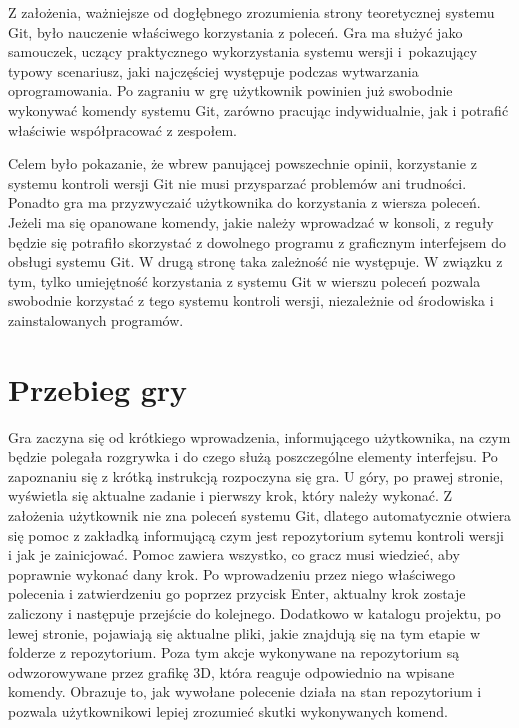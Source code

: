 \documentclass[11pt,a4paper,polish,thesis]{dcsbook}
\begin{document}
	Z założenia, ważniejsze od dogłębnego zrozumienia strony teoretycznej systemu Git, było nauczenie właściwego korzystania z poleceń. Gra ma służyć jako samouczek, uczący praktycznego wykorzystania systemu wersji i~pokazujący typowy scenariusz, jaki najczęściej występuje podczas wytwarzania oprogramowania. Po zagraniu w grę użytkownik powinien już swobodnie wykonywać komendy systemu Git, zarówno pracując indywidualnie, jak i potrafić właściwie współpracować z zespołem. 
	
	Celem było pokazanie, że wbrew panującej powszechnie opinii, korzystanie z systemu kontroli wersji Git nie musi przysparzać problemów ani trudności. Ponadto gra ma przyzwyczaić użytkownika do korzystania z wiersza poleceń. Jeżeli ma się opanowane komendy, jakie należy wprowadzać w konsoli, z reguły będzie się potrafiło skorzystać z dowolnego programu z graficznym interfejsem do obsługi systemu Git. W drugą stronę taka zależność nie występuje. W związku z tym, tylko umiejętność korzystania z systemu Git w wierszu poleceń pozwala swobodnie korzystać z tego systemu kontroli wersji, niezależnie od środowiska i zainstalowanych programów.
	 
	\section{Przebieg gry}
	
	Gra zaczyna się od krótkiego wprowadzenia, informującego użytkownika, na czym będzie polegała rozgrywka i do czego służą poszczególne elementy interfejsu. Po zapoznaniu się z krótką instrukcją rozpoczyna się gra. U góry, po prawej stronie, wyświetla się aktualne zadanie i pierwszy krok, który należy wykonać. Z założenia użytkownik nie zna poleceń systemu Git, dlatego automatycznie otwiera się pomoc z zakładką informującą czym jest repozytorium sytemu kontroli wersji i jak je zainicjować. Pomoc zawiera wszystko, co gracz musi wiedzieć, aby poprawnie wykonać dany krok. Po wprowadzeniu przez niego właściwego polecenia i zatwierdzeniu go poprzez przycisk Enter, aktualny krok zostaje zaliczony i następuje przejście do kolejnego. Dodatkowo w katalogu projektu, po lewej stronie, pojawiają się aktualne pliki, jakie znajdują się na tym etapie w folderze z repozytorium. Poza tym akcje wykonywane na repozytorium są odwzorowywane przez grafikę 3D, która reaguje odpowiednio na wpisane komendy. Obrazuje to, jak wywołane polecenie działa na stan repozytorium i pozwala użytkownikowi lepiej zrozumieć skutki wykonywanych komend. 
	
\end{document}
